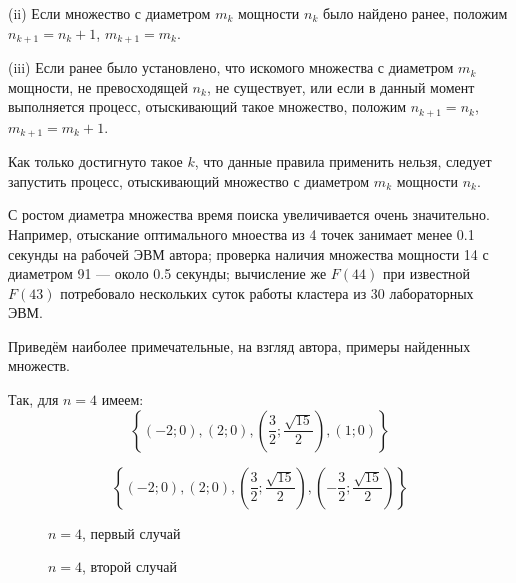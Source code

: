 \documentclass{article}
\begin{document}
(ii)
Если множество с диаметром $m_k$ мощности $n_k$ было найдено ранее, положим $n_{k+1} = n_k +1$, $m_{k+1} = m_k$.

(iii)
Если ранее было установлено, что искомого множества с диаметром $m_k$ мощности, не превосходящей $n_k$, не существует,
или если в данный момент выполняется процесс, отыскивающий такое множество, положим $n_{k+1} = n_k$, $m_{k+1} = m_k+1$.

Как только достигнуто такое $k$, что данные правила применить нельзя, следует запустить процесс, отыскивающий множество с диаметром $m_k$ мощности $n_k$.


С ростом диаметра множества время поиска увеличивается очень значительно.
Например, отыскание оптимального мноества из 4 точек занимает менее 0.1 секунды на рабочей ЭВМ автора;
проверка наличия множества мощности 14 с диаметром 91 --- около 0.5 секунды;
вычисление же $F(44)$ при известной $F(43)$ потребовало нескольких суток работы кластера из 30 лабораторных ЭВМ.



Приведём наиболее примечательные, на взгляд автора, примеры найденных множеств.

Так, для $n=4$ имеем:
$$
\left\{\left( -2 ; 0\right),\left( 2 ; 0\right),\left( \frac{3}{2} ; \frac{\sqrt{15}}{2}\right),\left( 1 ; 0\right)\right\}
$$

$$
\left\{\left( -2 ; 0\right),\left( 2 ; 0\right),\left( \frac{3}{2} ; \frac{\sqrt{15}}{2}\right),\left( -\frac{3}{2} ; \frac{\sqrt{15}}{2}\right)\right\}
$$


\begin{figure}[h]
\caption{$n=4$, первый случай}
\label{ris:image}
\end{figure}

\begin{figure}[h]
\caption{$n=4$, второй случай}
\label{ris:image}
\end{figure}
\end{document}
